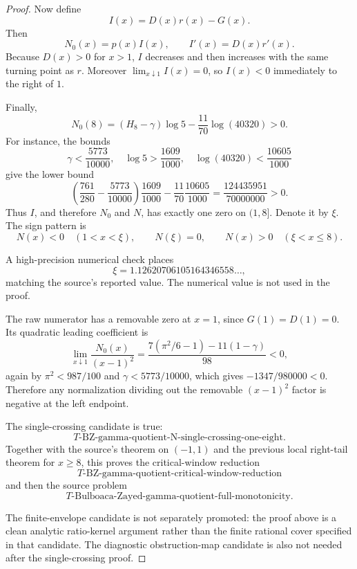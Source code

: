 \begin{proof}
Now define
\[
I(x)=D(x)r(x)-G(x).
\]
Then
\[
N_0(x)=p(x)I(x),\qquad I'(x)=D(x)r'(x).
\]
Because \(D(x)>0\) for \(x>1\), \(I\) decreases and then increases with the
same turning point as \(r\).  Moreover \(\lim_{x\downarrow1}I(x)=0\), so
\(I(x)<0\) immediately to the right of \(1\).

Finally,
\[
N_0(8)=(H_8-\gamma)\log5-\frac{11}{70}\log(40320)>0.
\]
For instance, the bounds
\[
\gamma<\frac{5773}{10000},\quad \log5>\frac{1609}{1000},
\quad \log(40320)<\frac{10605}{1000}
\]
give the lower bound
\[
\left(\frac{761}{280}-\frac{5773}{10000}\right)\frac{1609}{1000}
-\frac{11}{70}\frac{10605}{1000}
=\frac{124435951}{70000000}>0.
\]
Thus \(I\), and therefore \(N_0\) and \(N\), has exactly one zero on
\((1,8]\).  Denote it by \(\xi\).  The sign pattern is
\[
N(x)<0\quad(1<x<\xi),\qquad
N(\xi)=0,\qquad
N(x)>0\quad(\xi<x\le8).
\]

A high-precision numerical check places
\[
\xi=1.12620706105164346558\ldots,
\]
matching the source's reported value.  The numerical value is not used in the
proof.

The raw numerator has a removable zero at \(x=1\), since \(G(1)=D(1)=0\).  Its
quadratic leading coefficient is
\[
\lim_{x\downarrow1}\frac{N_0(x)}{(x-1)^2}
=
\frac{7(\pi^2/6-1)-11(1-\gamma)}{98}<0,
\]
again by \(\pi^2<987/100\) and \(\gamma<5773/10000\), which gives
\(-1347/980000<0\).  Therefore any normalization dividing out the removable
\((x-1)^2\) factor is negative at the left endpoint.

The single-crossing candidate is true:
\[
T\text{-BZ-gamma-quotient-N-single-crossing-one-eight}.
\]
Together with the source's theorem on \((-1,1)\) and the previous local
right-tail theorem for \(x\ge8\), this proves the critical-window reduction
\[
T\text{-BZ-gamma-quotient-critical-window-reduction}
\]
and then the source problem
\[
T\text{-Bulboaca-Zayed-gamma-quotient-full-monotonicity}.
\]

The finite-envelope candidate is not separately promoted: the proof above is a
clean analytic ratio-kernel argument rather than the finite rational cover
specified in that candidate.  The diagnostic obstruction-map candidate is also
not needed after the single-crossing proof.
\end{proof}

